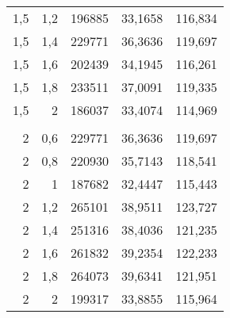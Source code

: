 \begin{table}[htbp]
\begin{tabular}{rrrrr}
    1,5   & 1,2   & 196885 & 33,1658 & 116,834 \\
    1,5   & 1,4   & 229771 & 36,3636 & 119,697 \\
    1,5   & 1,6   & 202439 & 34,1945 & 116,261 \\
    1,5   & 1,8   & 233511 & 37,0091 & 119,335 \\
    1,5   & 2     & 186037 & 33,4074 & 114,969 \\
          &       &       &       &  \\
    2     & 0,6   & 229771 & 36,3636 & 119,697 \\
    2     & 0,8   & 220930 & 35,7143 & 118,541 \\
    2     & 1     & 187682 & 32,4447 & 115,443 \\
    2     & 1,2   & 265101 & 38,9511 & 123,727 \\
    2     & 1,4   & 251316 & 38,4036 & 121,235 \\
    2     & 1,6   & 261832 & 39,2354 & 122,233 \\
    2     & 1,8   & 264073 & 39,6341 & 121,951 \\
    2     & 2     & 199317 & 33,8855 & 115,964 \\
    \bottomrule
    \end{tabular}%
  \label{tab:test1}%
\end{table}%
